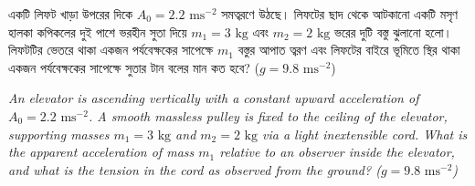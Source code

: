 \documentclass[12pt, a4paper]{article}
\begin{document}
\begin{tcolorbox}[questionbox={প্রশ্ন (Question) 9}]
    \noindent
    একটি লিফট খাড়া উপরের দিকে $A_0 = 2.2\text{ ms}^{-2}$ সমত্বরণে উঠছে। লিফটের ছাদ থেকে আটকানো একটি মসৃণ হালকা কপিকলের দুই পাশে ভরহীন সুতা দিয়ে $m_1 = 3\text{ kg}$ এবং $m_2 = 2\text{ kg}$ ভরের দুটি বস্তু ঝুলানো হলো। লিফটটির ভেতরে থাকা একজন পর্যবেক্ষকের সাপেক্ষে $m_1$ বস্তুর আপাত ত্বরণ এবং লিফটের বাইরে ভূমিতে স্থির থাকা একজন পর্যবেক্ষকের সাপেক্ষে সুতার টান বলের মান কত হবে? ($g = 9.8\text{ ms}^{-2}$)
    
    \vspace{0.8em}
    \begin{english}
    \noindent\textit{\color{darkgray}
    An elevator is ascending vertically with a constant upward acceleration of $A_0 = 2.2\text{ ms}^{-2}$. A smooth massless pulley is fixed to the ceiling of the elevator, supporting masses $m_1 = 3\text{ kg}$ and $m_2 = 2\text{ kg}$ via a light inextensible cord. What is the apparent acceleration of mass $m_1$ relative to an observer inside the elevator, and what is the tension in the cord as observed from the ground? ($g = 9.8\text{ ms}^{-2}$)
    }
    \end{english}
\end{tcolorbox}
\end{document}
